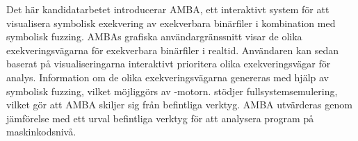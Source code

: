 Det här kandidatarbetet introducerar AMBA, ett interaktivt system för att visualisera symbolisk exekvering av exekverbara binärfiler i kombination med symbolisk fuzzing.
AMBAs grafiska användargränssnitt visar de olika exekveringsvägarna för exekverbara binärfiler i realtid.
Användaren kan sedan baserat på visualiseringarna interaktivt prioritera olika exekveringsvägar för analys.
Information om de olika exekveringsvägarna genereras med hjälp av symbolisk fuzzing, vilket möjliggörs av \stoe{}-motorn.
\stoe{} stödjer fullsystemsemulering, vilket gör att AMBA skiljer sig från befintliga verktyg.
AMBA utvärderas genom jämförelse med ett urval befintliga verktyg för att analysera program på maskinkodsnivå.
